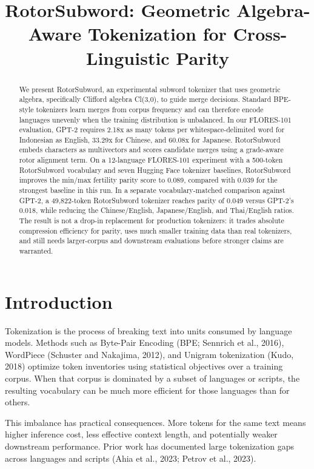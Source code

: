 \documentclass[11pt]{article}
\title{RotorSubword: Geometric Algebra-Aware Tokenization for Cross-Linguistic Parity}
\author{}
\date{}
\begin{document}
\maketitle

\begin{abstract}
We present RotorSubword, an experimental subword tokenizer that uses geometric algebra, specifically Clifford algebra Cl(3,0), to guide merge decisions. Standard BPE-style tokenizers learn merges from corpus frequency and can therefore encode languages unevenly when the training distribution is unbalanced. In our FLORES-101 evaluation, GPT-2 requires 2.18x as many tokens per whitespace-delimited word for Indonesian as English, 33.29x for Chinese, and 60.08x for Japanese. RotorSubword embeds characters as multivectors and scores candidate merges using a grade-aware rotor alignment term. On a 12-language FLORES-101 experiment with a 500-token RotorSubword vocabulary and seven Hugging Face tokenizer baselines, RotorSubword improves the min/max fertility parity score to 0.089, compared with 0.039 for the strongest baseline in this run. In a separate vocabulary-matched comparison against GPT-2, a 49,822-token RotorSubword tokenizer reaches parity of 0.049 versus GPT-2's 0.018, while reducing the Chinese/English, Japanese/English, and Thai/English ratios. The result is not a drop-in replacement for production tokenizers: it trades absolute compression efficiency for parity, uses much smaller training data than real tokenizers, and still needs larger-corpus and downstream evaluations before stronger claims are warranted.
\end{abstract}

\section{Introduction}

Tokenization is the process of breaking text into units consumed by language models. Methods such as Byte-Pair Encoding (BPE; Sennrich et al., 2016), WordPiece (Schuster and Nakajima, 2012), and Unigram tokenization (Kudo, 2018) optimize token inventories using statistical objectives over a training corpus. When that corpus is dominated by a subset of languages or scripts, the resulting vocabulary can be much more efficient for those languages than for others.

This imbalance has practical consequences. More tokens for the same text means higher inference cost, less effective context length, and potentially weaker downstream performance. Prior work has documented large tokenization gaps across languages and scripts (Ahia et al., 2023; Petrov et al., 2023).
\end{document}
